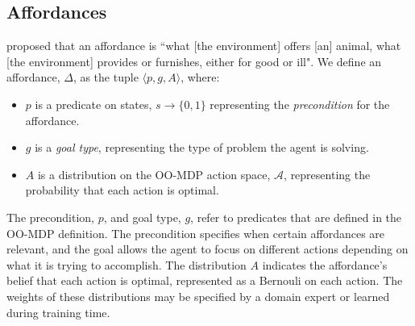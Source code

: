 \documentclass[conference]{IEEEtran}
\begin{document}


\subsection{Affordances}

\citet{gibson77} proposed that an affordance is ``what [the
  environment] offers [an] animal, what [the environment] provides or
furnishes, either for good or ill". 
We define an affordance, $\Delta$, as the tuple $\langle p, g, A \rangle$, where:
\begin{itemize}
\item $p$ is a predicate on states, $s \longrightarrow \{$0$, 1\}$ representing the {\em precondition} for the affordance. 
\item $g$ is a {\it goal type}, representing the type of problem the agent is solving.
\item $A$ is a distribution on the OO-MDP action space, $\mathcal{A}$, representing the probability that each action is optimal.
\end{itemize}

The precondition, $p$, and goal type, $g$, refer to predicates that are defined in the OO-MDP definition.
The precondition specifies when certain affordances are relevant, and the goal allows the agent to focus
on different actions depending on what it is trying to accomplish. The distribution $A$ indicates the affordance's
belief that each action is optimal, represented as a Bernouli on each action. The weights of these distributions may
be specified by a domain expert or learned during training time.
\end{document}
